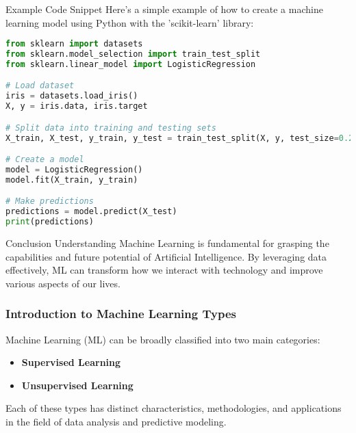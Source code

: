 \documentclass[aspectratio=169]{beamer}
\begin{document}
\begin{frame}[fragile]{Example Code Snippet}
    Here’s a simple example of how to create a machine learning model using Python with the 'scikit-learn' library:
    \begin{lstlisting}[language=Python]
from sklearn import datasets
from sklearn.model_selection import train_test_split
from sklearn.linear_model import LogisticRegression

# Load dataset
iris = datasets.load_iris()
X, y = iris.data, iris.target

# Split data into training and testing sets
X_train, X_test, y_train, y_test = train_test_split(X, y, test_size=0.2, random_state=42)

# Create a model
model = LogisticRegression()
model.fit(X_train, y_train)

# Make predictions
predictions = model.predict(X_test)
print(predictions)
    \end{lstlisting}
\end{frame}

\begin{frame}{Conclusion}
    Understanding Machine Learning is fundamental for grasping the capabilities and future potential of Artificial Intelligence. By leveraging data effectively, ML can transform how we interact with technology and improve various aspects of our lives.
\end{frame}

\begin{frame}[fragile]
    \frametitle{Introduction to Machine Learning Types}
    Machine Learning (ML) can be broadly classified into two main categories: 
    \begin{itemize}
        \item \textbf{Supervised Learning}
        \item \textbf{Unsupervised Learning}
    \end{itemize}
    Each of these types has distinct characteristics, methodologies, and applications in the field of data analysis and predictive modeling.
\end{frame}
\end{document}
